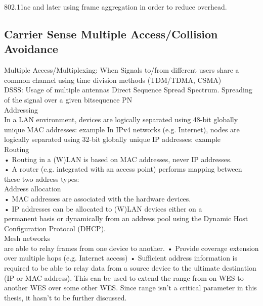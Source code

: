 802.11ac and later using frame aggregation in order to reduce overhead.

\subsection{Carrier Sense Multiple Access/Collision Avoidance}
Multiple Access/Multiplexing: When Signals to/from different users share a common channel using time division methods (TDM/TDMA, CSMA)\\

DSSS: Usage of multiple antennas
Direct Sequence Spread Spectrum. Spreading of the signal over a given bitsequence PN\\

Addressing\\
In a LAN environment, devices are logically separated using 48-bit
globally unique MAC addresses: example
In IPv4 networks (e.g. Internet), nodes are logically separated
using 32-bit globally unique IP addresses: example \\

Routing\\
• Routing in a (W)LAN is based on MAC addresses, never IP addresses.\\
• A router (e.g. integrated with an access point) performs mapping between\\
these two address types: \\

Address allocation\\
• MAC addresses are associated with the hardware devices.\\
• IP addresses can be allocated to (W)LAN devices either on a\\
permanent basis or dynamically from an address pool using the
Dynamic Host Configuration Protocol (DHCP). \\

Mesh networks\\
are able to relay frames from one device to another.
• Provide coverage extension over multiple hops (e.g. Internet access)
• Sufficient address information is required to be able to relay data from a
source device to the ultimate destination (IP or MAC address).
This can be used to extend the range from on \ac{WES} to another \ac{WES} over some other \ac{WES}.
Since range isn't a critical parameter in this thesis, it hasn't to be further discussed.\\


